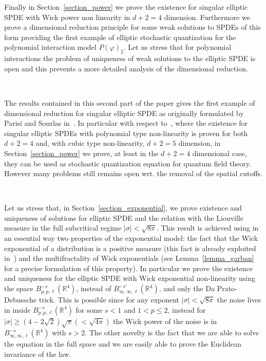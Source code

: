 \documentclass[a4paper,10pt]{article}
\begin{document}
Finally in Section~\ref{section_power} we prove the existence for singular
elliptic SPDE with Wick power non linearity in $d + 2 = 4$ dimension.
Furthermore we prove a dimensional reduction principle for some weak solutions
to SPDEs of this form providing the first example of elliptic stochastic
quantization for the polynomial interaction model $P (\varphi)_2$. Let us
stress that for polynomial interactions the problem of uniqueness of weak
solutions to the elliptic SPDE is open and this prevents a more detailed
analysis of the dimensional reduction.

\

The results contained in this second part of the paper gives the first
example of dimensional reduction for singular elliptic SPDE as originally
formulated by Parisi and Sourlas in~{\cite{parisi_random_1979}}. In particular
with respect to~{\cite{GH18}}, where the existence for singular elliptic SPDEs
with polynomial type non-linearity is proven for both $d + 2 = 4$ and, with
cubic type non-linearity, $d + 2 = 5$ dimension, in
Section~\ref{section_power} we prove, at least in the $d + 2 = 4$ dimensional
case, they can be used as stochastic quantization equation for quantum field
theory. However many problems still remains open wrt. the removal of the
spatial cutoffs.

\

Let us stress that, in Section~\ref{section_exponential}, we prove existence
and uniqueness of solutions for elliptic SPDE and the relation with the
Liouville measure in the full subcritical regime $| \sigma | < \sqrt{8 \pi}$.
This result is achieved using in an essential way two properties of the
exponential model: the fact that the Wick exponential of a distribution is a
positive measure (this fact is already exploited in~{\cite{Garban2018}}) and
the multifractality of Wick exponentials (see Lemma~\ref{lemma_garban} for a
precise formulation of this property). In particular we prove the existence
and uniqueness for the elliptic SPDE with Wick exponential non-linearity using
the space $B^{- s}_{p, p, \ell} (\mathbb{R}^4)$, instead of $B^{- s'}_{\infty,
\infty, \ell} (\mathbb{R}^4)$, and only the Da Prato-Debussche trick. This is
possible since for any exponent $| \sigma | < \sqrt{8 \pi}$ the noise lives in
inside $B^{- s}_{p, p, \ell} (\mathbb{R}^4)$ for some $s < 1$ and $1 < p
\leqslant 2$, instead for $| \sigma | \geqslant \left( 4 - 2 \sqrt{2} \right)
\sqrt{\pi} \left( < \sqrt{4 \pi} \right)$ the Wick power of the noise is in
$B^{- s}_{\infty, \infty, \ell} (\mathbb{R}^4)$ with $s > 2$. The other
novelty is the fact that we are able to solve the equation in the full space
and we are easily able to prove the Euclidean invariance of the law.
\end{document}

